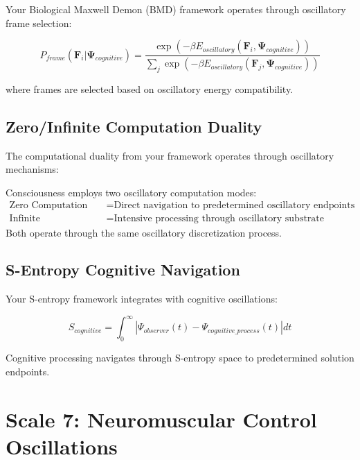 \documentclass[twocolumn]{article}
\begin{document}
Your Biological Maxwell Demon (BMD) framework operates through oscillatory frame selection:

\begin{equation}
P_{frame}(\mathbf{F}_i | \mathbf{\Psi}_{cognitive}) = \frac{\exp(-\beta E_{oscillatory}(\mathbf{F}_i, \mathbf{\Psi}_{cognitive}))}{\sum_j \exp(-\beta E_{oscillatory}(\mathbf{F}_j, \mathbf{\Psi}_{cognitive}))}
\end{equation}

where frames are selected based on oscillatory energy compatibility.

\subsection{Zero/Infinite Computation Duality}

The computational duality from your framework operates through oscillatory mechanisms:

\begin{definition}
Consciousness employs two oscillatory computation modes:
\begin{align}
\text{Zero Computation} &= \text{Direct navigation to predetermined oscillatory endpoints} \\
\text{Infinite Computation} &= \text{Intensive processing through oscillatory substrate}
\end{align}
Both operate through the same oscillatory discretization process.
\end{definition}

\subsection{S-Entropy Cognitive Navigation}

Your S-entropy framework integrates with cognitive oscillations:

\begin{equation}
S_{cognitive} = \int_0^{\infty} |\Psi_{observer}(t) - \Psi_{cognitive\_process}(t)| dt
\end{equation}

Cognitive processing navigates through S-entropy space to predetermined solution endpoints.

\section{Scale 7: Neuromuscular Control Oscillations}
\end{document}
